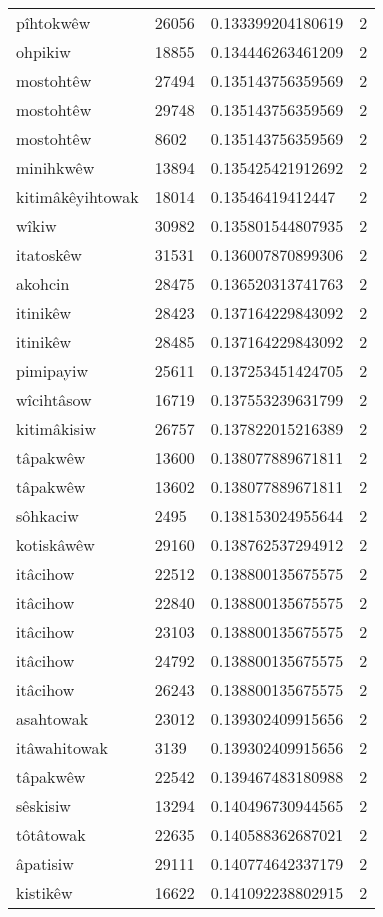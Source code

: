 \begin{longtable}{llll}
pîhtokwêw & 26056 & 0.133399204180619 & 2 \\
ohpikiw & 18855 & 0.134446263461209 & 2 \\
mostohtêw & 27494 & 0.135143756359569 & 2 \\
mostohtêw & 29748 & 0.135143756359569 & 2 \\
mostohtêw & 8602 & 0.135143756359569 & 2 \\
minihkwêw & 13894 & 0.135425421912692 & 2 \\
kitimâkêyihtowak & 18014 & 0.13546419412447 & 2 \\
wîkiw & 30982 & 0.135801544807935 & 2 \\
itatoskêw & 31531 & 0.136007870899306 & 2 \\
akohcin & 28475 & 0.136520313741763 & 2 \\
itinikêw & 28423 & 0.137164229843092 & 2 \\
itinikêw & 28485 & 0.137164229843092 & 2 \\
pimipayiw & 25611 & 0.137253451424705 & 2 \\
wîcihtâsow & 16719 & 0.137553239631799 & 2 \\
kitimâkisiw & 26757 & 0.137822015216389 & 2 \\
tâpakwêw & 13600 & 0.138077889671811 & 2 \\
tâpakwêw & 13602 & 0.138077889671811 & 2 \\
sôhkaciw & 2495 & 0.138153024955644 & 2 \\
kotiskâwêw & 29160 & 0.138762537294912 & 2 \\
itâcihow & 22512 & 0.138800135675575 & 2 \\
itâcihow & 22840 & 0.138800135675575 & 2 \\
itâcihow & 23103 & 0.138800135675575 & 2 \\
itâcihow & 24792 & 0.138800135675575 & 2 \\
itâcihow & 26243 & 0.138800135675575 & 2 \\
asahtowak & 23012 & 0.139302409915656 & 2 \\
itâwahitowak & 3139 & 0.139302409915656 & 2 \\
tâpakwêw & 22542 & 0.139467483180988 & 2 \\
sêskisiw & 13294 & 0.140496730944565 & 2 \\
tôtâtowak & 22635 & 0.140588362687021 & 2 \\
âpatisiw & 29111 & 0.140774642337179 & 2 \\
kistikêw & 16622 & 0.141092238802915 & 2 \\

\end{longtable}
